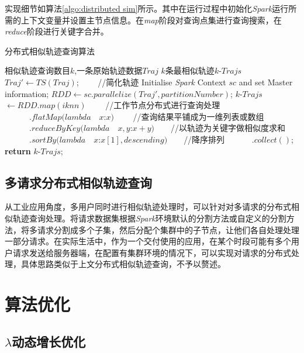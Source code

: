 实现细节如算法\ref{algo:distributed sim}所示。其中在运行过程中初始化\emph{Spark}运行所需的上下文变量并设置主节点信息。在\emph{map}阶段对查询点集进行查询搜索，在\emph{reduce}阶段进行关键字合并。

\begin{algorithm}
\caption{分布式相似轨迹查询算法}
\label{algo:distributed sim}
\begin{algorithmic}[1] %
\Require 相似轨迹查询数目$k$,一条原始轨迹数据$Traj$%
\Ensure $k$条最相似轨迹$k$-$Trajs$ %
\State $Traj' \gets TS(Traj)$; $\qquad$//简化轨迹
\State Initialise \emph{Spark} Context $sc$ and set Master information;
\State $RDD \gets sc.parallelize(Traj', partitionNumber)$;
\State $k$-$Trajs$ $\gets RDD.map(iknn) $ $\qquad$//工作节点分布式进行查询处理
\State $\qquad\quad.flatMap(lambda\quad x$:$x)$ $\qquad$//查询结果平铺成为一维列表或数组
\State $\qquad\quad.reduceByKey(lambda\quad x,y$:$x+y)$$\qquad$//以轨迹为关键字做相似度求和
\State $\quad\qquad.sortBy(lambda\quad x$:$x[1], descending)$$\qquad$//降序排列
\State $\quad\qquad.collect()$;
\State \textbf{return} $k$-$Trajs$; 
\end{algorithmic}
\end{algorithm}

\subsection{多请求分布式相似轨迹查询}
\label{subsec:distributed multiple}
从工业应用角度，多用户同时进行相似轨迹处理时，可以针对对多请求的分布式相似轨迹查询处理。将请求数据集根据\emph{Spark}环境默认的分割方法或自定义的分割方法，将多请求分割成多个子集，然后分配个集群中的子节点，让他们各自处理处理一部分请求。在实际生活中，作为一个交付使用的应用，在某个时段可能有多个用户请求发送给服务器端，在配置有集群环境的情况下，可以实现对请求的分布式处理，具体思路类似于上文分布式相似轨迹查询，不予以赘述。




\section{算法优化}
\label{sec:optimization}

\subsection{$\lambda$动态增长优化}
\label{subsec:lambda}

